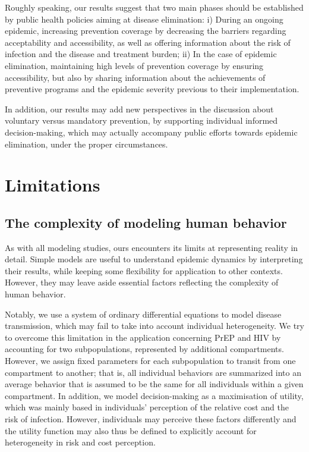 Roughly speaking, our results suggest that two main phases should be established by public health policies aiming at disease elimination: i) During an ongoing epidemic, increasing prevention coverage by decreasing the barriers regarding acceptability and accessibility, as well as offering information about the risk of infection and the disease and treatment burden; ii) In the case of epidemic elimination, maintaining high levels of prevention coverage by ensuring accessibility, but also by sharing information about  the achievements of preventive programs and the epidemic severity previous to their implementation. 

In addition, our results may add new perspectives in the discussion about voluntary versus mandatory prevention, by supporting individual informed decision-making, which may actually accompany public efforts towards epidemic elimination, under the proper circumstances.

\section{Limitations}
\subsection{The complexity of modeling human behavior}
As with all modeling studies, ours encounters its limits at representing reality in detail. Simple models are useful to understand epidemic dynamics by interpreting their results, while keeping some flexibility for application to other contexts. However, they may leave aside essential factors reflecting the complexity of human behavior. 

Notably, we use a system of ordinary differential equations to model disease transmission, which may fail to take into account individual heterogeneity. We try to overcome this limitation in the application concerning PrEP and HIV by accounting for two subpopulations, represented by additional compartments. However, we assign fixed parameters for each subpopulation to transit from one compartment to another; that is, all individual behaviors are summarized into an average behavior that is assumed to be the same for all individuals within a given compartment. In addition, we model decision-making as a maximisation of utility, which was mainly based in individuals' perception of the relative cost and the risk of infection. However, individuals may perceive these factors differently and the utility function may also thus be defined to explicitly account for heterogeneity in risk and cost perception. 


